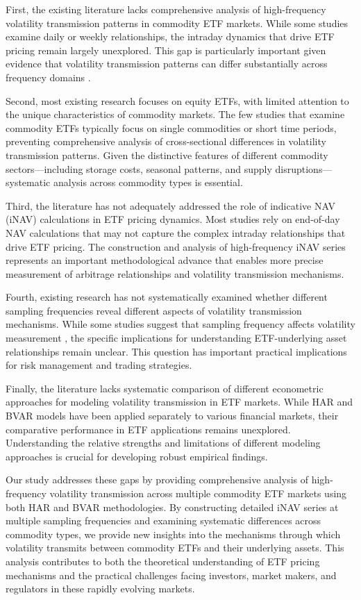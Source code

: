 First, the existing literature lacks comprehensive analysis of high-frequency volatility transmission patterns in commodity ETF markets. While some studies examine daily or weekly relationships, the intraday dynamics that drive ETF pricing remain largely unexplored. This gap is particularly important given evidence that volatility transmission patterns can differ substantially across frequency domains \citep{barunik2018measuring}.

Second, most existing research focuses on equity ETFs, with limited attention to the unique characteristics of commodity markets. The few studies that examine commodity ETFs typically focus on single commodities or short time periods, preventing comprehensive analysis of cross-sectional differences in volatility transmission patterns. Given the distinctive features of different commodity sectors—including storage costs, seasonal patterns, and supply disruptions—systematic analysis across commodity types is essential.

Third, the literature has not adequately addressed the role of indicative NAV (iNAV) calculations in ETF pricing dynamics. Most studies rely on end-of-day NAV calculations that may not capture the complex intraday relationships that drive ETF pricing. The construction and analysis of high-frequency iNAV series represents an important methodological advance that enables more precise measurement of arbitrage relationships and volatility transmission mechanisms.

Fourth, existing research has not systematically examined whether different sampling frequencies reveal different aspects of volatility transmission mechanisms. While some studies suggest that sampling frequency affects volatility measurement \citep{hansen2005realized}, the specific implications for understanding ETF-underlying asset relationships remain unclear. This question has important practical implications for risk management and trading strategies.

Finally, the literature lacks systematic comparison of different econometric approaches for modeling volatility transmission in ETF markets. While HAR and BVAR models have been applied separately to various financial markets, their comparative performance in ETF applications remains unexplored. Understanding the relative strengths and limitations of different modeling approaches is crucial for developing robust empirical findings.

Our study addresses these gaps by providing comprehensive analysis of high-frequency volatility transmission across multiple commodity ETF markets using both HAR and BVAR methodologies. By constructing detailed iNAV series at multiple sampling frequencies and examining systematic differences across commodity types, we provide new insights into the mechanisms through which volatility transmits between commodity ETFs and their underlying assets. This analysis contributes to both the theoretical understanding of ETF pricing mechanisms and the practical challenges facing investors, market makers, and regulators in these rapidly evolving markets.

